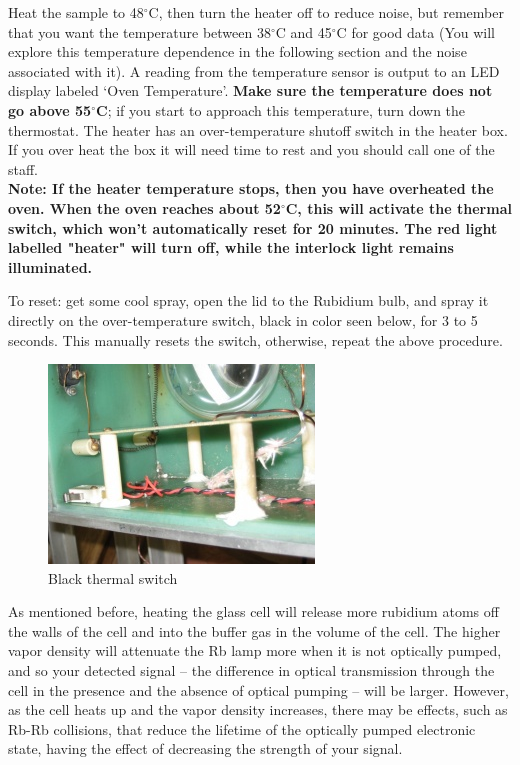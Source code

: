 \documentclass{../lab}
\begin{document}
Heat the sample to 48$^\circ$C, then turn the heater off to reduce noise, but remember that you want the temperature between 38$^\circ$C and 45$^\circ$C for good data (You will explore this temperature dependence in the following section and the noise associated with it). A reading from the temperature sensor is output to an LED display labeled `Oven Temperature'. \textbf{Make sure the temperature does not go above 55$^\circ$C}; if you start to approach this temperature, turn down the thermostat. The heater has an over-temperature shutoff switch in the heater box. If you over heat the box it will need time to rest and you should call one of the staff. \\

\textbf{Note: If the heater temperature stops, then you have overheated the oven.
When the oven reaches about 52$^\circ$C, this will activate the thermal switch, which won't automatically reset for 20 minutes. The red light labelled "heater" will turn off, while the interlock light remains illuminated.}

To reset: get some cool spray, open the lid to the Rubidium bulb, and spray it directly on the over-temperature switch, black in color seen below, for 3 to 5 seconds. This manually resets the switch, otherwise, repeat the above procedure.

    \begin{figure}[h!]
        \centering
        \includegraphics[width=0.6\linewidth]{images/IMG_4500}
        \caption{Black thermal switch}
    \end{figure}


As mentioned before, heating the glass cell will release more rubidium atoms off the walls of the cell and into the buffer gas in the volume of the cell. The higher vapor density will attenuate the Rb lamp more when it is not optically pumped, and so your detected signal -- the difference in optical transmission through the cell in the presence and the absence of optical pumping -- will be larger. However, as the cell heats up and the vapor density increases, there may be effects, such as Rb-Rb collisions, that reduce the lifetime of the optically pumped electronic state, having the effect of decreasing the strength of your signal. \\
\end{document}
